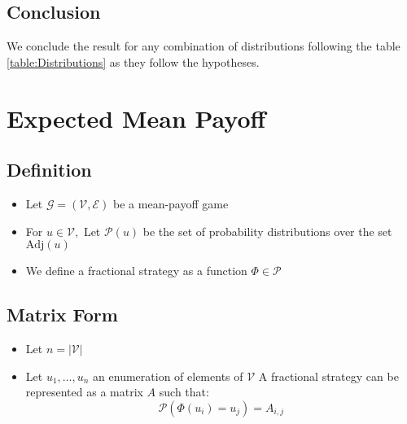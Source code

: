 \subsection{Conclusion}
We conclude the result for any combination of distributions following the table \ref{table:Distributions} as they follow the hypotheses.

\section{Expected Mean Payoff}
\subsection{Definition}
\begin{itemize}
	\item Let $\mathcal{G}=(\mathcal{V},\mathcal{E})$ be a mean-payoff game
	\item For $u\in\mathcal{V},$ Let $\mathscr{P}(u)$ be the set of probability distributions over the set $\text{Adj}(u)$
	\item We define a fractional strategy as a function $\Phi\in \mathscr{P}$

\end{itemize}


\subsection{Matrix Form}
\begin{itemize}
	\item Let $n=\lvert \mathcal{V}\rvert$
	\item Let $u_1,\dots,u_n$ an enumeration of elements of $\mathcal{V}$
	A fractional strategy can be represented as a matrix $A$ such that:
	$$
	\mathcal{P}(\Phi(u_i)=u_j)=A_{i,j}
	$$
\end{itemize}

